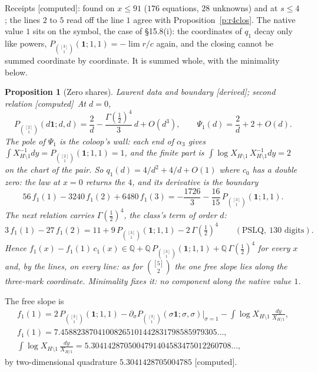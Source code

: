 \documentclass[11pt]{article}
\newcommand{\one}{\mathbf 1}
\newcommand{\Pth}{P_{\binom{[3]}1}(\one;1,1)}
\theoremstyle{plain}
\newtheorem{proposition}{Proposition}[section]
\theoremstyle{definition}
\theoremstyle{remark}
\newcommand{\derived}{\textup{[derived]}}
\newcommand{\computed}{\textup{[computed]}}
\begin{document}
\noindent Receipts \computed: found on $x\le91$ ($176$ equations, $28$ unknowns) and at $s\le4$; the lines $2$ to $5$ read off the line $1$ agree with Proposition~\ref{p:r4clos}. The native value $1$ sits on the symbol, the case of \S15.8(i): the coordinates of $q_1$ decay only like powers, $\Pth=-\lim r/c$ again, and the closing cannot be summed coordinate by coordinate. It is summed whole, with the minimality below.

\begin{proposition}[Zero shares]\label{p:r4zero}Laurent data and boundary \derived; second relation \computed\
At $d=0$,
\[
P_{\binom{[2]}1}(d\one;d,d)=\frac2d-\frac{\Gamma(\frac12)^4}{3}\,d+O(d^3),\qquad \Psi_1(d)=\frac2d+2+O(d) .
\]
The pole of $\Psi_1$ is the coloop's wall: each end of $\alpha_3$ gives $\int X_{H\setminus1}^{-1}dy=P_{\binom{[2]}1}(\one;1,1)=1$, and the finite part is $\int\log X_{H\setminus1}\,X_{H\setminus1}^{-1}dy=2$ on the chart of the pair. So $q_1(d)=4/d^2+4/d+O(1)$ where $c_0$ has a double zero: the law at $x=0$ returns the $4$, and its derivative is the boundary
\[
56\,f_1(1)-3240\,f_1(2)+6480\,f_1(3)=-\frac{1726}3-\frac{16}{15}\,\Pth .
\]
The next relation carries $\Gamma(\frac12)^4$, the class's term of order $d$:
\[
3\,f_1(1)-27\,f_1(2)=11+9\,\Pth-2\,\Gamma(\tfrac12)^4\qquad(\text{PSLQ},\ 130\text{ digits}).
\]
Hence $f_1(x)-f_1(1)\,c_1(x)\in\mathbb Q+\mathbb Q\,\Pth+\mathbb Q\,\Gamma(\frac12)^4$ for every $x$ and, by the lines, on every line: as for $\binom{[5]}2$ the one free slope lies along the three-mark coordinate. Minimality fixes it: no component along the native value $1$.
\end{proposition}

\noindent The free slope is
\begin{gather*}
f_1(1)=2\,\Pth-\partial_\sigma P_{\binom{[3]}1}(\sigma\one;\sigma,\sigma)\big|_{\sigma=1}-\int\log X_{H\setminus1}\,\frac{dy}{X_{H/1}},\\
f_1(1)=7.45882387041008265101442831798585979305\ldots,\\
\int\log X_{H\setminus1}\,\frac{dy}{X_{H/1}}=5.3041428705004791404583475012260708\ldots,
\end{gather*}
by two-dimensional quadrature $5.3041428705004785$ \computed.
\end{document}
